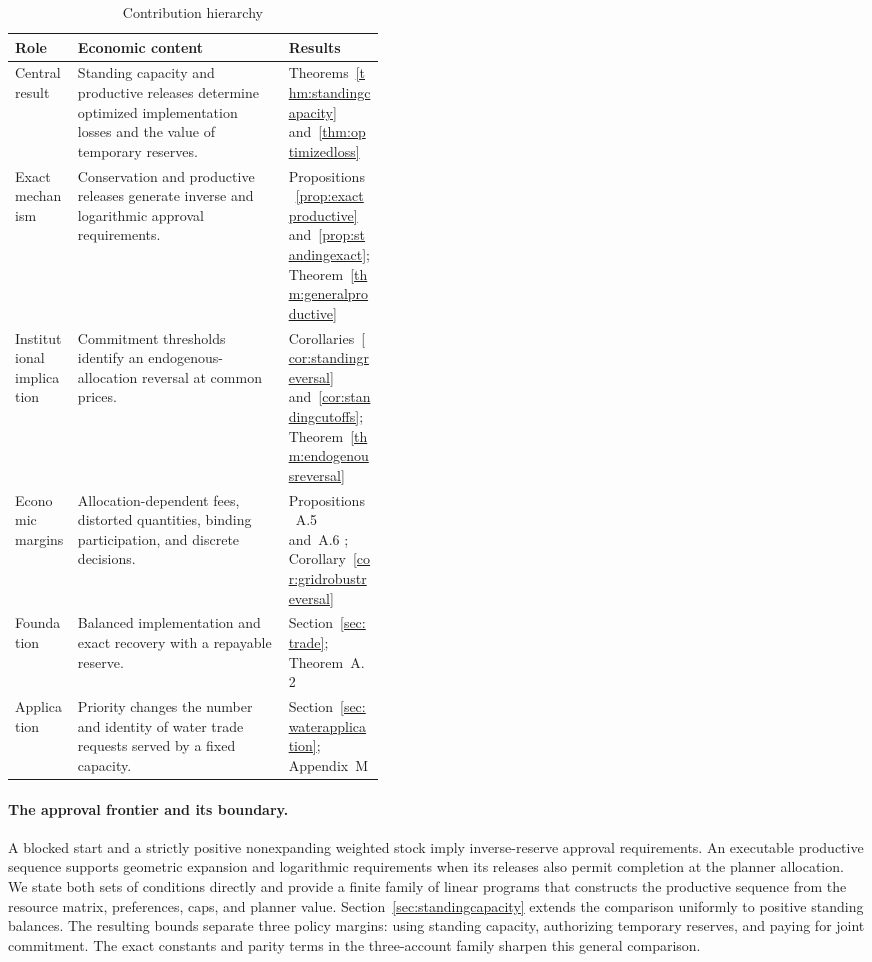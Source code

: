 \documentclass[ecta,draft]{econsocart}
\theoremstyle{definition}
\theoremstyle{definition}
\begin{document}
\begin{table}[!htbp]
\centering
\caption{Contribution hierarchy}
\label{tab:contributions}
\begin{tabularx}{\linewidth}{@{}>{\raggedright\arraybackslash}p{0.17\linewidth}>{\raggedright\arraybackslash}X>{\raggedright\arraybackslash}p{0.26\linewidth}@{}}
\toprule
Role & Economic content & Results\\
\midrule
Central result & Standing capacity and productive releases determine optimized implementation losses and the value of temporary reserves. & Theorems~\ref{thm:standingcapacity} and~\ref{thm:optimizedloss}\\[3pt]
Exact mechanism & Conservation and productive releases generate inverse and logarithmic approval requirements. & Propositions~\ref{prop:exactproductive} and~\ref{prop:standingexact}; Theorem~\ref{thm:generalproductive}\\[3pt]
Institutional implication & Commitment thresholds identify an endogenous-allocation reversal at common prices. & Corollaries~\ref{cor:standingreversal} and~\ref{cor:standingcutoffs}; Theorem~\ref{thm:endogenousreversal}\\[3pt]
Economic margins & Allocation-dependent fees, distorted quantities, binding participation, and discrete decisions. & Propositions~A.5%
 and~A.6%
; Corollary~\ref{cor:gridrobustreversal}\\[3pt]
Foundation & Balanced implementation and exact recovery with a repayable reserve. & Section~\ref{sec:trade}; Theorem~A.2%
\\[3pt]
Application & Priority changes the number and identity of water trade requests served by a fixed capacity. & Section~\ref{sec:waterapplication}; Appendix~M%
\\
\bottomrule
\end{tabularx}
\end{table}

\paragraph{The approval frontier and its boundary.}
A blocked start and a strictly positive nonexpanding weighted stock imply
inverse-reserve approval requirements. An executable productive sequence
supports geometric expansion and logarithmic requirements when its releases
also permit completion at the planner allocation. We state both sets of
conditions directly and provide a finite family of linear programs that
constructs the productive sequence from the resource matrix, preferences,
caps, and planner value. Section~\ref{sec:standingcapacity} extends the
comparison uniformly to positive standing balances. The resulting bounds
separate three policy margins: using standing capacity, authorizing
temporary reserves, and paying for joint commitment. The exact constants
and parity terms in the three-account family sharpen this general comparison.
\end{document}
